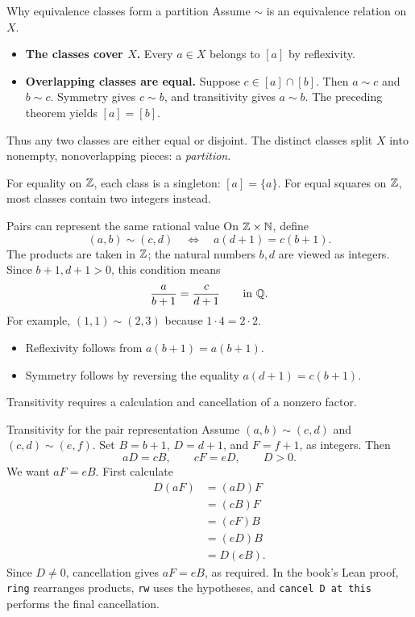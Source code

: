 \begin{frame}{Why equivalence classes form a partition}
Assume $\sim$ is an equivalence relation on $X$.
\begin{itemize}
\item \textbf{The classes cover $X$.} Every $a\in X$ belongs to $[a]$ by reflexivity.
\item \textbf{Overlapping classes are equal.} Suppose $c\in[a]\cap[b]$.
Then $a\sim c$ and $b\sim c$. Symmetry gives $c\sim b$, and transitivity gives $a\sim b$.
The preceding theorem yields $[a]=[b]$.
\end{itemize}
Thus any two classes are either equal or disjoint. The distinct classes split $X$
into nonempty, nonoverlapping pieces: a \emph{partition}.
\medskip

For equality on $\mathbb{Z}$, each class is a singleton: $[a]=\{a\}$.
For equal squares on $\mathbb{Z}$, most classes contain two integers instead.
\end{frame}

\begin{frame}{Pairs can represent the same rational value}
On $\mathbb{Z}\times\mathbb{N}$, define
\[
 (a,b)\sim(c,d)\quad\Longleftrightarrow\quad a(d+1)=c(b+1).
\]
The products are taken in $\mathbb{Z}$; the natural numbers $b,d$ are viewed as integers.
Since $b+1,d+1>0$, this condition means
\[
 \frac{a}{b+1}=\frac{c}{d+1}\qquad\text{in }\mathbb{Q}.
\]
For example, $(1,1)\sim(2,3)$ because $1\cdot4=2\cdot2$.
\begin{itemize}
\item Reflexivity follows from $a(b+1)=a(b+1)$.
\item Symmetry follows by reversing the equality $a(d+1)=c(b+1)$.
\end{itemize}
Transitivity requires a calculation and cancellation of a nonzero factor.
\end{frame}

\begin{frame}{Transitivity for the pair representation}
Assume $(a,b)\sim(c,d)$ and $(c,d)\sim(e,f)$.
Set $B=b+1$, $D=d+1$, and $F=f+1$, as integers. Then
\[
 aD=cB,\qquad cF=eD,\qquad D>0.
\]
We want $aF=eB$. First calculate
\[
\begin{aligned}
 D(aF)&=(aD)F\\
      &=(cB)F\\
      &=(cF)B\\
      &=(eD)B\\
      &=D(eB).
\end{aligned}
\]
Since $D\ne0$, cancellation gives $aF=eB$, as required.
In the book's Lean proof, \texttt{ring} rearranges products, \texttt{rw} uses the hypotheses,
and \texttt{cancel D at this} performs the final cancellation.
\end{frame}

